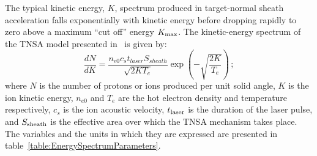 The typical kinetic energy, $K$, spectrum produced in target-normal
sheath acceleration falls exponentially with kinetic energy before
dropping rapidly to zero above a maximum ``cut off'' energy
$K_{\rm max}$. 
The kinetic-energy spectrum of the TNSA model presented
in~\cite{10.1038/nphys199} is given by:
\begin{equation}
  \frac{dN}{dK} = \frac{n_{e0} c_{s} t_{laser} S_{sheath}}
                                 {\sqrt{2K T_{e}}}
                                 \exp\left(
                                     - \sqrt{\frac{2K}{T_{e}}}
                                     \right)\,;
  \label{Eq:Spct:0}
\end{equation}
where $N$ is the number of protons or ions produced per unit solid
angle, $K$ is the ion kinetic energy, $n_{e0}$ and
$T_e$ are the hot electron density and temperature respectively, $c_s$
is the ion acoustic velocity, $t_{\rm laser}$ is the duration of the
laser pulse, and $S_{\rm sheath}$ is the effective area over which the
TNSA mechanism takes place.
The variables and the units in which they are expressed are presented
in table~\ref{table:EnergySpectrumParameters}.
